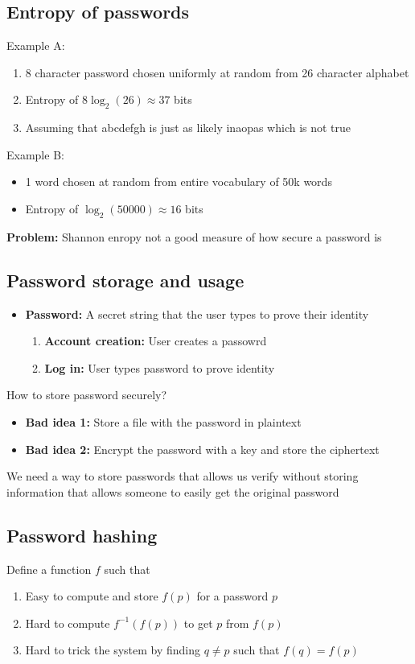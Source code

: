\documentclass[12pt,a4paper]{article}
\begin{document}
\subsection{Entropy of passwords}
Example A:
\begin{enumerate}
    \item 8 character password chosen uniformly at random from 26 character alphabet
    \item Entropy of $8\log_2(26) \approx 37$ bits
    \item Assuming that abcdefgh is just as likely inaopas which is not true
\end{enumerate}

\noindent Example B:
\begin{itemize}
    \item 1 word chosen at random from entire vocabulary of 50k words
    \item Entropy of $\log_2(50000) \approx 16$ bits
\end{itemize}

\noindent \textbf{Problem:} Shannon enropy not a good measure of how secure a password is

\subsection{Password storage and usage}
\begin{itemize}
    \item \textbf{Password:} A secret string that the user types to prove their identity
    \begin{enumerate}
        \item \textbf{Account creation:} User creates a passowrd 
        \item \textbf{Log in:} User types password to prove identity
    \end{enumerate}
\end{itemize}
\noindent How to store password securely?
\begin{itemize}
    \item \textbf{Bad idea 1:} Store a file with the password in plaintext
    \item \textbf{Bad idea 2:} Encrypt the password with a key and store the ciphertext
\end{itemize}
\noindent We need a way to store passwords that allows us verify without storing information that allows someone to easily get the original password

\subsection{Password hashing}
Define a function $f$ such that 
\begin{enumerate}
    \item Easy to compute and store $f(p)$ for a password $p$
    \item Hard to compute $f^{-1}(f(p))$ to get $p$ from $f(p)$
    \item Hard to trick the system by finding $q \neq p$ such that $f(q) = f(p)$
\end{enumerate}
\end{document}
